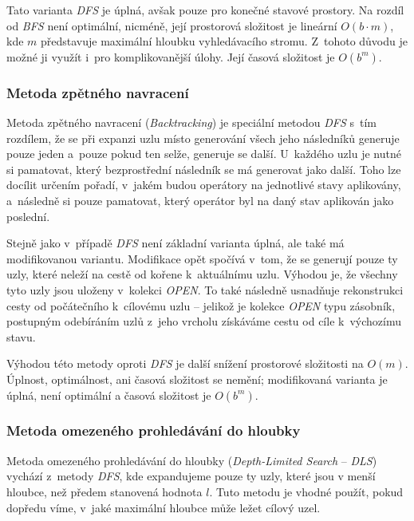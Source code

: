 Tato varianta \emph{DFS} je úplná, avšak pouze pro konečné stavové prostory. Na rozdíl od \emph{BFS} není optimální, nicméně, její prostorová složitost je lineární $O(b \cdot m)$, kde $m$ představuje maximální hloubku vyhledávacího stromu. Z~tohoto důvodu je možné ji využít i~pro komplikovanější úlohy. Její časová složitost je $O(b^m)$.

\subsubsection*{Metoda zpětného navracení}

Metoda zpětného navracení (\emph{Backtracking}) \cite{AI_Russel_Norvig} je speciální metodou \emph{DFS} s~tím rozdílem, že se při expanzi uzlu místo generování všech jeho následníků generuje pouze jeden a~pouze pokud ten selže, generuje se další. U~každého uzlu je nutné si pamatovat, který bezprostřední následník se má generovat jako další. Toho lze docílit určením pořadí, v~jakém budou operátory na jednotlivé stavy aplikovány, a~následně si pouze pamatovat, který operátor byl na daný stav aplikován jako poslední.

Stejně jako v~případě \emph{DFS} není základní varianta úplná, ale také má modifikovanou variantu. Modifikace opět spočívá v~tom, že se generují pouze ty uzly, které neleží na cestě od kořene k~aktuálnímu uzlu. Výhodou je, že všechny tyto uzly jsou uloženy v~kolekci \emph{OPEN}. To také následně usnadňuje rekonstrukci cesty od počátečního k~cílovému uzlu -- jelikož je kolekce \emph{OPEN} typu zásobník, postupným odebíráním uzlů z~jeho vrcholu získáváme cestu od cíle k~výchozímu stavu.

Výhodou této metody oproti \emph{DFS} je další snížení prostorové složitosti na $O(m)$. Úplnost, optimálnost, ani časová složitost se nemění; modifikovaná varianta je úplná, není optimální a časová složitost je $O(b^m)$.

\subsubsection*{Metoda omezeného prohledávání do hloubky}

Metoda omezeného prohledávání do hloubky (\emph{Depth-Limited Search} -- \emph{DLS}) \cite{AI_Russel_Norvig} vychází z~metody \emph{DFS}, kde expandujeme pouze ty uzly, které jsou v menší hloubce, než předem stanovená hodnota $l$. Tuto metodu je vhodné použít, pokud dopředu víme, v~jaké maximální hloubce může ležet cílový uzel.


